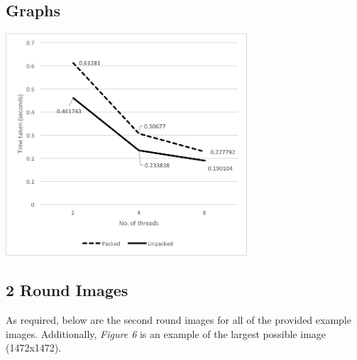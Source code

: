 \documentclass[11pt, oneside]{article}
\newenvironment{Figure}
  {\par\medskip\noindent\minipage{\linewidth}}
  {\endminipage\par\medskip}
\begin{document}
\pagebreak
\subsection{Graphs}

\begin{Figure}
\includegraphics[width=9cm]{images/64x64graph.png}
\end{Figure}



\subsection{2 Round Images}
As required, below are the second round images for all of the provided example images. Additionally, \emph{Figure 6} is an example of the largest possible image (1472x1472).
\end{document}
